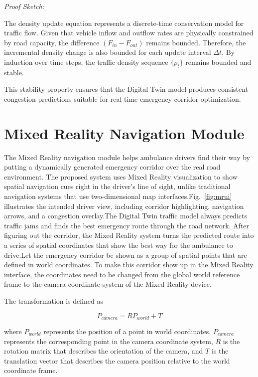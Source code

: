 \documentclass[conference]{IEEEtran}
\begin{document}
\textit{Proof Sketch:}

The density update equation represents a discrete-time conservation model for traffic flow.
Given that vehicle inflow and outflow rates are physically constrained by road capacity, the difference $(F_{in}-F_{out})$ remains bounded.
Therefore, the incremental density change is also bounded for each update interval $\Delta t$.
By induction over time steps, the traffic density sequence $\{\rho_t\}$ remains bounded and stable.

This stability property ensures that the Digital Twin model produces consistent congestion predictions suitable for real-time emergency corridor optimization.

\section{Mixed Reality Navigation Module}
The Mixed Reality navigation module helps ambulance drivers find their way by putting a dynamically generated emergency corridor over the real road environment. The proposed system uses Mixed Reality visualization to show spatial navigation cues right in the driver's line of sight, unlike traditional navigation systems that use two-dimensional map interfaces.Fig.~\ref{fig:mrui} illustrates the intended driver view, including corridor highlighting, navigation arrows, and a congestion overlay.The Digital Twin traffic model always predicts traffic jams and finds the best emergency route through the road network. After figuring out the corridor, the Mixed Reality system turns the predicted route into a series of spatial coordinates that show the best way for the ambulance to drive.Let the emergency corridor be shown as a group of spatial points that are defined in world coordinates. To make this corridor show up in the Mixed Reality interface, the coordinates need to be changed from the global world reference frame to the camera coordinate system of the Mixed Reality device.

The transformation is defined as

\begin{equation}
P_{camera} = R P_{world} + T
\end{equation}

where $P_{world}$ represents the position of a point in world coordinates, $P_{camera}$ represents the corresponding point in the camera coordinate system, $R$ is the rotation matrix that describes the orientation of the camera, and $T$ is the translation vector that describes the camera position relative to the world coordinate frame.
\end{document}
